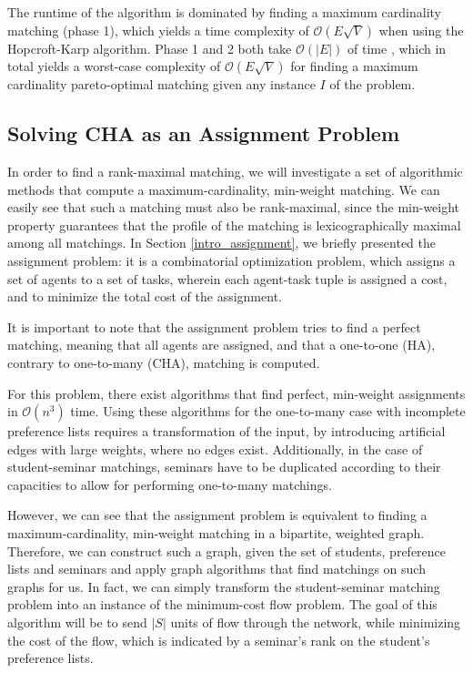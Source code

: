 The runtime of the algorithm is dominated by finding a maximum cardinality matching (phase 1), which yields a time complexity of $\mathcal{O}(E\sqrt{V})$ \cite{Abraham:Pacha} when using the Hopcroft-Karp algorithm. Phase 1 and 2 both take $\mathcal{O}(|E|)$ of time \cite{SngThesis}, which in total yields a worst-case complexity of $\mathcal{O}(E\sqrt{V})$ for finding a maximum cardinality pareto-optimal matching given any instance $I$ of the problem.

\subsection{Solving CHA as an Assignment Problem}\label{algo:assignment}
In order to find a rank-maximal matching, we will investigate a set of algorithmic methods that compute a maximum-cardinality, min-weight matching. We can easily see that such a matching must also be rank-maximal, since the min-weight property guarantees that the profile of the matching is lexicographically maximal among all matchings.
In Section \ref{intro_assignment}, we briefly presented the assignment problem: it is a combinatorial optimization problem, which assigns a set of agents to a set of tasks, wherein each agent-task tuple is assigned a cost, and to minimize the total cost of the assignment. 

It is important to note that the assignment problem tries to find a perfect matching, meaning that all agents are assigned, and that a one-to-one (HA), contrary to one-to-many (CHA), matching is computed.

For this problem, there exist algorithms \cite{Munkres, Jonker1987} that find perfect, min-weight assignments in $\mathcal{O}(n^3)$ time. Using these algorithms for the one-to-many case with incomplete preference lists requires a transformation of the input, by introducing artificial edges with large weights, where no edges exist. Additionally, in the case of student-seminar matchings, seminars have to be duplicated according to their capacities to allow for performing one-to-many matchings.
  
However, we can see that the assignment problem is equivalent to finding a maximum-cardinality, min-weight matching in a bipartite, weighted graph. Therefore, we can construct such a graph, given the set of students, preference lists and seminars and apply graph algorithms that find matchings on such graphs for us. In fact, we can simply transform the student-seminar matching problem into an instance of the minimum-cost flow problem. The goal of this algorithm will be to send $|S|$ units of flow through the network, while minimizing the cost of the flow, which is indicated by a seminar's rank on the student's preference lists.

